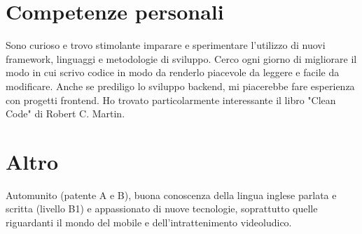 \documentclass[margin, 10pt]{res} %
\begin{document}
\begin{resume}
\begin{itemize}
\end{itemize}

\section{Competenze personali}

Sono curioso e trovo stimolante imparare e sperimentare l'utilizzo di nuovi framework, linguaggi e metodologie di sviluppo. Cerco ogni giorno di migliorare il modo in cui scrivo codice in modo da renderlo piacevole da leggere e facile da modificare. Anche se prediligo lo sviluppo backend, mi piacerebbe fare esperienza con progetti frontend. Ho trovato particolarmente interessante il libro "Clean Code" di Robert C. Martin.

\section{Altro}

Automunito (patente A e B), buona conoscenza della lingua inglese parlata e scritta (livello B1) e appassionato di nuove tecnologie, soprattutto quelle riguardanti il mondo del mobile e dell'intrattenimento videoludico.

\end{resume}
\end{document}
